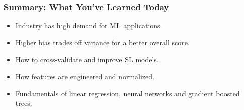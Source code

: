 \begin{frame}
\frametitle{Summary: What You've Learned Today}
\begin{itemize}
	\item Industry has high demand for ML applications.\pause
	\item Higher bias trades off variance for a better overall score.\pause
	\item How to cross-validate and improve SL models.\pause
	\item How features are engineered and normalized.\pause
	\item Fundamentals of linear regression, neural networks and gradient boosted trees.
\end{itemize}
\end{frame}
